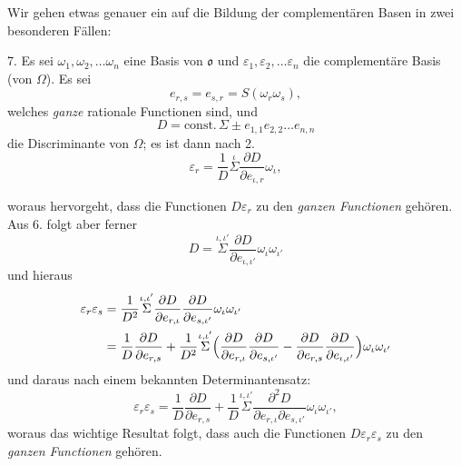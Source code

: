 \documentclass{article}
\begin{document}
Wir gehen etwas genauer ein auf die Bildung der complementären Basen in zwei besonderen Fällen:

7. Es sei $\omega_{1}, \omega_{2}, \ldots \omega_{n}$ eine Basis von $\mathfrak{o}$ und $\varepsilon_{1}, \varepsilon_{2}, \ldots \varepsilon_{n}$ die complementäre Basis (von $\Omega$). Es sei
\[ e_{r,s} = e_{s,r} = S(\omega_{r}\omega_{s}), \]
welches \emph{ganze} rationale Functionen sind, und
\[ D = \text{const.}\,\Sigma \pm e_{1,1}e_{2,2}\ldots e_{n,n} \]
die Discriminante von $\Omega$; es ist dann nach 2.
\[ \varepsilon_{r} = \frac{1}{D}\overset{\iota}{\Sigma}\frac{\partial D}{\partial e_{\iota,r}}\omega_{\iota}, \]

woraus hervorgeht, dass die Functionen $D\varepsilon_{r}$ zu den \emph{ganzen Functionen} gehören. Aus 6. folgt aber ferner
\[ D = \overset{\iota,\iota'}{\Sigma}\frac{\partial D}{\partial e_{\iota,\iota'}}\omega_{\iota}\omega_{\iota'} \]
und hieraus
\[ \begin{aligned} \varepsilon_{r}\varepsilon_{s} &= \frac{1}{D^{2}}\overset{\iota,\iota'}{\Sigma}\frac{\partial D}{\partial e_{r,\iota}}\frac{\partial D}{\partial e_{s,\iota'}}\omega_{\iota}\omega_{\iota'} \\ &= \frac{1}{D}\frac{\partial D}{\partial e_{r,s}} + \frac{1}{D^{2}}\overset{\iota,\iota'}{\Sigma}\Bigl(\frac{\partial D}{\partial e_{r,\iota}}\frac{\partial D}{\partial e_{s,\iota'}} - \frac{\partial D}{\partial e_{r,s}}\frac{\partial D}{\partial e_{\iota,\iota'}}\Bigr)\omega_{\iota}\omega_{\iota'} \end{aligned} \]
und daraus nach einem bekannten Determinantensatz:
\[ \varepsilon_{r}\varepsilon_{s} = \frac{1}{D}\frac{\partial D}{\partial e_{r,s}} + \frac{1}{D}\overset{\iota,\iota'}{\Sigma}\frac{\partial^{2}D}{\partial e_{r,\iota}\partial e_{s,\iota'}}\omega_{\iota}\omega_{\iota'}, \]
woraus das wichtige Resultat folgt, dass auch die Functionen $D\varepsilon_{r}\varepsilon_{s}$ zu den \emph{ganzen Functionen} gehören.
\end{document}
